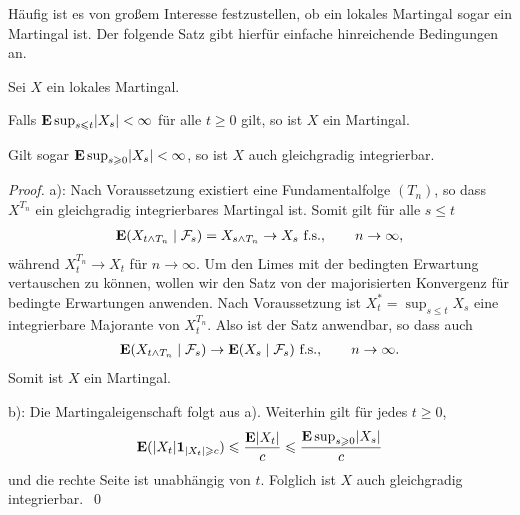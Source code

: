 Häufig ist es von großem Interesse festzustellen, ob ein lokales Martingal
sogar ein Martingal ist. Der folgende Satz gibt hierfür einfache hinreichende
Bedingungen an.

\begin{prop}
\label{prop:1.32}
 Sei $X$ ein lokales Martingal.
\begin{propenum}
\item Falls $\mathbf{E}\sup_{s\leqslant t} \lvert X_s\rvert < \infty$ für alle $t\ge 0$ gilt,
  so ist $X$ ein Martingal.
\item Gilt sogar $\mathbf{E}\sup_{s\geqslant 0} \lvert X_s\rvert < \infty$, so ist $X$
auch gleichgradig integrierbar.\fish
\end{propenum}
\end{prop}
\begin{proof}
a): Nach Voraussetzung existiert eine Fundamentalfolge $(T_n)$, so dass
$X^{T_n}$ ein gleichgradig integrierbares Martingal ist. Somit gilt für alle
$s\le t$
\begin{align*}
\mathbf{E} (X_{t\wedge T_n}\mid \mathcal{F}_s ) = X_{s\wedge T_n}\to X_s\ \text{f.s.},\qquad n\to
\infty,
\end{align*}
während $X_{t}^{T_n}\to X_t$ \fs für $n\to \infty$. Um den Limes mit der
bedingten Erwartung vertauschen zu können, wollen wir den Satz von der
majorisierten Konvergenz für bedingte Erwartungen anwenden. Nach Voraussetzung
ist $X_t^* = \sup_{s\le t} X_s$ eine integrierbare Majorante von $X_t^{T_n}$. Also
ist der Satz anwendbar, so dass auch
\begin{align*}
\mathbf{E} (X_{t\wedge T_n}\mid \mathcal{F}_s )\to \mathbf{E} (X_{s}\mid \mathcal{F}_s )\ \text{f.s.},\qquad n\to
\infty.
\end{align*}
Somit ist $X$ ein Martingal.

b): Die Martingaleigenschaft folgt aus a). Weiterhin gilt für jedes $t\ge 0$,
\begin{align*}
\mathbf{E} (\lvert X_{t}\rvert\mathbf{1}_{\lvert X_t\rvert\geqslant c}) \leqslant \frac{\mathbf{E} \lvert X_t\rvert}{c}
\leqslant \frac{\mathbf{E} \sup_{s\geqslant 0} \lvert X_s\rvert}{c}
\end{align*}
und die rechte Seite ist unabhängig von $t$. Folglich ist $X$ auch gleichgradig
integrierbar.~\qed

\end{proof}

% 
% 
% 
% 
% 
% 
